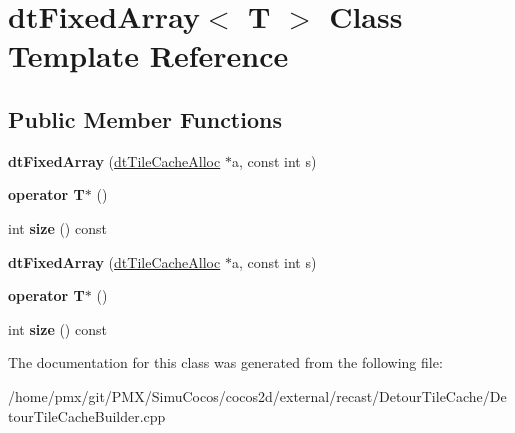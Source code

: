 \hypertarget{classdtFixedArray}{}\section{dt\+Fixed\+Array$<$ T $>$ Class Template Reference}
\label{classdtFixedArray}
\subsection*{Public Member Functions}
\begin{DoxyCompactItemize}
\item 
\mbox{\label{classdtFixedArray_a33185d41a3c263367ab862014104f89e}} 
{\bfseries dt\+Fixed\+Array} (\hyperlink{structdtTileCacheAlloc}{dt\+Tile\+Cache\+Alloc} $\ast$a, const int s)
\item 
\mbox{\label{classdtFixedArray_a787d42a579a87d3fe763717576d9dac0}} 
{\bfseries operator T$\ast$} ()
\item 
\mbox{\label{classdtFixedArray_aff54b9aa9eb16e7cea87546e6b1aed93}} 
int {\bfseries size} () const
\item 
\mbox{\label{classdtFixedArray_a33185d41a3c263367ab862014104f89e}} 
{\bfseries dt\+Fixed\+Array} (\hyperlink{structdtTileCacheAlloc}{dt\+Tile\+Cache\+Alloc} $\ast$a, const int s)
\item 
\mbox{\label{classdtFixedArray_a787d42a579a87d3fe763717576d9dac0}} 
{\bfseries operator T$\ast$} ()
\item 
\mbox{\label{classdtFixedArray_aff54b9aa9eb16e7cea87546e6b1aed93}} 
int {\bfseries size} () const
\end{DoxyCompactItemize}


The documentation for this class was generated from the following file\+:\begin{DoxyCompactItemize}
\item 
/home/pmx/git/\+P\+M\+X/\+Simu\+Cocos/cocos2d/external/recast/\+Detour\+Tile\+Cache/Detour\+Tile\+Cache\+Builder.\+cpp\end{DoxyCompactItemize}
